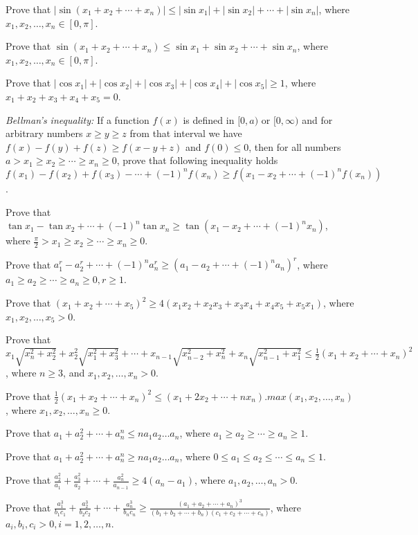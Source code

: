 \item Prove that $|\sin(x_1 + x_2 + \cdots + x_n)|\leq |\sin x_1| + |\sin x_2| + \cdots + |\sin x_n|$, where $x_1, x_2, \ldots, x_n
  \in [0, \pi]$.
\item Prove that $\sin(x_1 + x_2 + \cdots + x_n)\leq \sin x_1 + \sin x_2 + \cdots + \sin x_n$, where $x_1, x_2, \ldots, x_n
  \in [0, \pi]$.
\item Prove that $|\cos x_1| + |\cos x_2| + |\cos x_3| + |\cos x_4| + |\cos x_5|\geq 1$, where $x_1 + x_2 + x_3 + x_4 + x_5 = 0$.
\item {\it Bellman's inequality:} If a function $f(x)$ is defined in $[0, a)$ or $[0, \infty)$ and for arbitrary numbers $x\geq
  y\geq z$ from that interval we have $f(x) - f(y) + f(z)\geq f(x - y + z)$ and $f(0)\leq 0$, then for all numbers $a > x_1 \geq
  x_2\geq \cdots \geq x_n\geq 0$, prove that following inequality holds $f(x_1) -f(x_2) + f(x_3) - \cdots + (-1)^nf(x_n)\geq
  f(x_1 - x_2 + \cdots + (-1)^nf(x_n))$.
\item Prove that $\tan x_1 - \tan x_2 + \cdots + (-1)^n\tan x_n \geq \tan(x_1 - x_2 + \cdots + (-1)^nx_n)$, where $\frac{\pi}{2}>
  x_1\geq x_2\geq \cdots \geq x_n\geq 0$.
\item Prove that $a_1^r - a_2^r + \cdots +(-1)^na_n^r\geq (a_1 - a_2 + \cdots +(-1)^na_n)^r$, where $a_1\geq a_2\geq \cdots \geq
  a_n \geq 0, r\geq 1$.
\item Prove that $(x_1 + x_2 + \cdots + x_5)^2 \geq 4(x_1x_2 + x_2x_3 + x_3x_4 + x_4x_5 + x_5x_1)$, where $x_1, x_2, \ldots, x_5 >
  0$.
\item Prove that $x_1\sqrt{x_n^2 + x_2^2} + x_2^2\sqrt{x_1^2 + x_3^2} + \cdots + x_{n - 1}\sqrt{x_{n - 2}^2 + x_n^2} +
  x_n\sqrt{x_{n -1}^2 + x_1^2}\leq \frac{1}{2}(x_1 + x_2 + \cdots + x_n)^2$, where $n\geq 3$, and $x_1, x_2, \ldots, x_n > 0$.
\item Prove that $\frac{1}{2}(x_1 + x_2 + \cdots + x_n)^2\leq (x_1 + 2x_2 + \cdots + nx_n).max(x_1, x_2, \ldots, x_n)$, where $x_1,
  x_2, \ldots, x_n \geq 0$.
\item Prove that $a_1 + a_2^2 + \cdots + a_n^n\leq na_1a_2\ldots a_n$, where $a_1\geq a_2\geq \cdots \geq a_n \geq 1$.
\item Prove that $a_1 + a_2^2 + \cdots + a_n^n\geq na_1a_2\ldots a_n$, where $0\leq a_1 \leq a_2 \leq \cdots \leq a_n\leq 1$.
\item Prove that $\frac{a_2^2}{a_1} + \frac{a_3^2}{a_2} + \cdots + \frac{a_n^2}{a_{n - 1}}\geq 4(a_n - a_1)$, where $a_1, a_2,
  \ldots, a_n > 0$.
\item Prove that $\frac{a_1^3}{b_1c_1} + \frac{a_2^3}{b_2c_2} + \cdots + \frac{a_n^3}{b_nc_n}\geq \frac{(a_1 + a_2 + \cdots +
  a_n)^3}{(b_1 + b_2 + \cdots + b_n)(c_1 + c_2 + \cdots + c_n)}$, where $a_i, b_i, c_i > 0, i = 1, 2, \ldots, n$.
